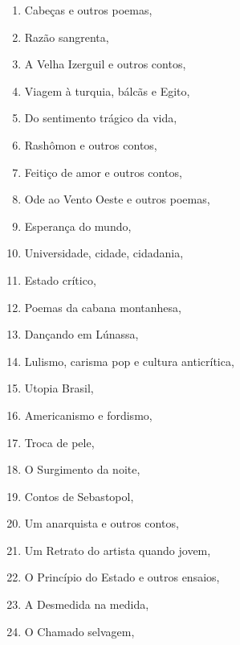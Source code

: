 \begin{multicols}{2}
\begin{enumerate}
\item Cabeças e outros poemas, {}
\item Razão sangrenta, {}
\item A Velha Izerguil e outros contos, {}
\item Viagem à turquia, bálcãs e Egito, {}
\item Do sentimento trágico da vida, {}
\item Rashômon e outros contos, {}
\item Feitiço de amor e outros contos, {}
\item Ode ao Vento Oeste e outros poemas, {}
\item Esperança do mundo, {}
\item Universidade, cidade, cidadania, {}
\item Estado crítico, {}
\item Poemas da cabana montanhesa, {}
\item Dançando em Lúnassa, {}
\item Lulismo, carisma pop e cultura anticrítica, {}
\item Utopia Brasil, {}
\item Americanismo e fordismo, {}
\item Troca de pele, {}
\item O Surgimento da noite, {}
\item Contos de Sebastopol, {}
\item Um anarquista e outros contos, {}
\item Um Retrato do artista quando jovem, {}
\item O Princípio do Estado e outros ensaios, {}
\item A Desmedida na medida, {}
\item O Chamado selvagem, {}

\end{enumerate}
\end{multicols}
